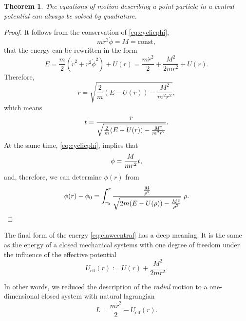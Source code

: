 \documentclass[english,fontsize=11pt,paper=a5,oneside]{scrbook}
\let\d\relax
\newcommand{\d}{\mathrm{d}}
\newtheorem{theorem}{Theorem}[chapter]
\theoremstyle{definition}
\begin{document}
\begin{theorem}
  The equations of motion describing a point particle in a central potential can always be solved by quadrature.
\end{theorem}
\begin{proof}
  It follows from the conservation of \eqref{eq:cyclicphi},
  \begin{equation}\label{eq:cyclicphi1}
    m r^2 \dot \phi = M = \mathrm{const},
  \end{equation}
  that the energy can be rewritten in the form
  \begin{equation}\label{eq:clawcentral}
    E = \frac m2 \left(\dot r^2 + r^2 \dot \phi^2\right) + U(r)
    = \frac {m \dot r^2}2 + \frac{M^2}{2m r^2} + U(r).
  \end{equation}
  Therefore,
  \begin{equation}
    \dot r = \sqrt{\frac2m(E-U(r)) - \frac{M^2}{m^2 r^2}},
  \end{equation}
  which means
  \begin{equation}\label{eq:timedep}
    \d t = \frac{\d r}{\sqrt{\frac2m(E-U(r)) - \frac{M^2}{m^2 r^2}}}.
  \end{equation}
  At the same time, \eqref{eq:cyclicphi}, implies that
  \begin{equation}
    \d \phi = \frac{M}{m r^2} \d t,
  \end{equation}
  and, therefore, we can determine $\phi(r)$ from
  \begin{equation}\label{eq:deltaphi}
    \phi(r) - \phi_0 =
    \int_{r_0}^r \frac{\frac{M}{\rho^2}}{\sqrt{2m(E-U(\rho)) - \frac{M^2}{\rho^2}}}\;\d \rho.
  \end{equation}
\end{proof}

The final form of the energy \eqref{eq:clawcentral} has a deep meaning.
It is the same as the energy of a closed mechanical systems with one degree of freedom under the influence of the effective potential
\begin{equation}\label{eq:effpotcp}
  U_{\mathrm{eff}}(r) := U(r) + \frac{M^2}{2 m r^2}.
\end{equation}

In other words, we reduced the description of the \emph{radial} motion to a one-dimensional closed system with natural lagrangian
\begin{equation}\label{eq:efflagcp}
  L = \frac{m \dot r^2}{2} - U_{\mathrm{eff}}(r).
\end{equation}
\end{document}
